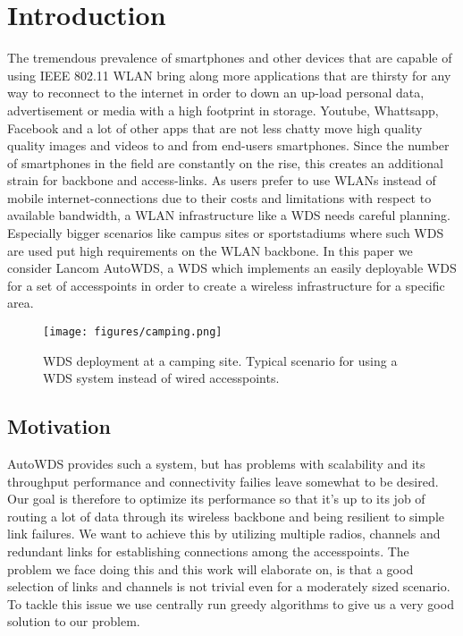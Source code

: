 \chapter{Introduction}
  The tremendous prevalence of smartphones and other devices that are capable of using IEEE 802.11 WLAN bring along 
  more applications that are thirsty for any way to reconnect to the internet in order to 
  down an up-load personal data, advertisement or media with a high footprint in storage.
  Youtube, Whattsapp, Facebook and a lot of other apps that are not less chatty move high quality quality images and videos 
  to and from end-users smartphones. Since the number of smartphones in the field are constantly on the rise, this creates an additional strain for
  backbone and access-links. As users prefer to use WLANs instead of mobile internet-connections due to their costs and limitations with respect to available bandwidth,
  a WLAN infrastructure like a WDS needs careful planning. Especially bigger scenarios like campus sites or sportstadiums where such WDS are used put high requirements on the
  WLAN backbone. In this paper we consider Lancom AutoWDS, 
  a WDS which implements an easily deployable \ac{WDS} for a set of accesspoints in order to create a wireless infrastructure for a specific area.

  \begin{figure}[h]
    \centering
    \texttt{[image: figures/camping.png]}
    \caption{WDS deployment at a camping site. Typical scenario for using a WDS system instead of wired accesspoints.}
    \label{fig:camping}
  \end{figure}
  
\section{Motivation}
  AutoWDS provides such a system, but has problems with scalability and its throughput performance and connectivity failies leave somewhat to be desired.
  Our goal is therefore to optimize its performance so that it's up to its job of routing a lot of data through its wireless backbone and being resilient to simple link
  failures. We want to achieve this by utilizing multiple radios, channels and redundant links for establishing connections among the accesspoints.
  The problem we face doing this and this work will elaborate on, is that a good selection of links and channels is not trivial even for a moderately sized scenario.
  To tackle this issue we use centrally run greedy algorithms to give us a very good solution to our problem.
  
